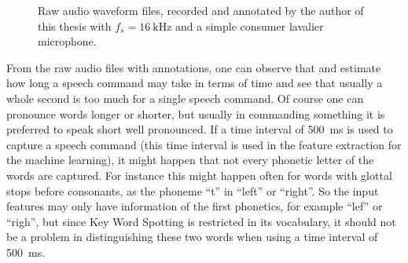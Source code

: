 \begin{figure}[!ht]
  \centering
  \caption{Raw audio waveform files, recorded and annotated by the author of this thesis with $f_s=\SI{16}{\kilo\hertz}$ and a simple consumer lavalier microphone.}
  \label{fig:raw_audio_my}
\end{figure}
\FloatBarrier
\noindent
From the raw audio files with annotations, one can observe that and estimate how long a speech command may take in terms of time and see that usually a whole second is too much for a single speech command.
Of course one can pronounce words longer or shorter, but usually in commanding something it is preferred to speak short well pronounced.
If a time interval of \SI{500}{\milli\second} is used to capture a speech command (this time interval is used in the feature extraction for the machine learning), it might happen that not every phonetic letter of the words are captured. 
For instance this might happen often for words with glottal stops before consonants, as the phoneme \enquote{t} in \enquote{left} or \enquote{right}.
So the input features may only have information of the first phonetics, for example \enquote{lef} or \enquote{righ}, but since Key Word Spotting is restricted in its vocabulary, it should not be a problem in distinguishing these two words when using a time interval of \SI{500}{\milli\second}.

